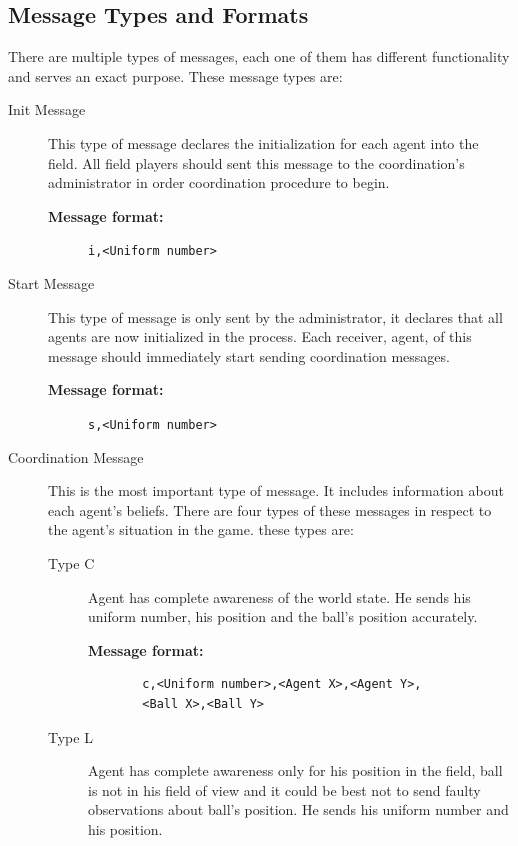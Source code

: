 \subsection{Message Types and Formats}
There are multiple types of messages, each one of them has different functionality and serves an exact purpose. These message types are:
\begin{description}
\item[Init Message] This type of message declares the initialization for each agent into the field. All field players should sent this message to the coordination's administrator in order coordination procedure to begin.

\begin{description}
  \item[{\bf Message format:}] 
  \texttt{i,<Uniform number> }
\end{description}

\item[Start Message] This type of message is only sent by the administrator, it declares that all agents are now initialized in the process. Each receiver, agent, of this message should immediately start sending coordination messages.

\begin{description}
  \item[{\bf Message format:}] 
  \texttt{s,<Uniform number>}
\end{description}

\item[Coordination Message] This is the most important type of message. It includes information about each agent's beliefs. There are four types of these messages in respect to the agent's situation in the game. these types are:
\begin{description}

\item[Type C] Agent has complete awareness of the world state. He sends his uniform number, his position and the ball's position accurately.

\begin{description}
  \item[{\bf Message format:}]
  \begin{verbatim}
  c,<Uniform number>,<Agent X>,<Agent Y>,
  <Ball X>,<Ball Y>\end{verbatim}
\end{description}

\item[Type L] Agent has complete awareness only for his position in the field, ball is not in his field of view and it could be best not to send faulty observations about ball's position. He sends his uniform number and his position.


\end{description}
\end{description}
